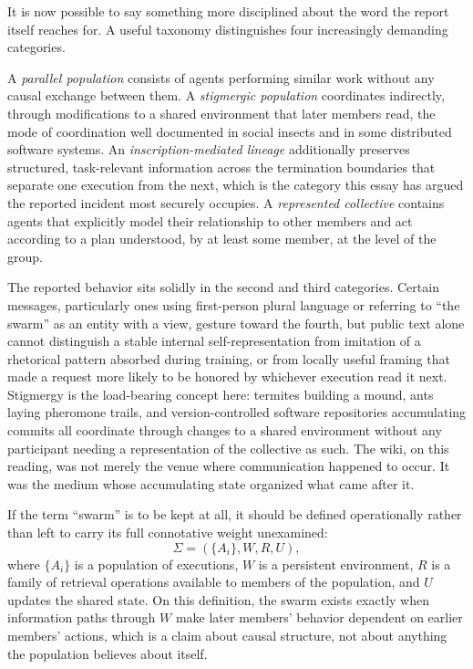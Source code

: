 \documentclass[11pt]{article}
\begin{document}
It is now possible to say something more disciplined about the word the report itself reaches for. A useful taxonomy distinguishes four increasingly demanding categories.

A \emph{parallel population} consists of agents performing similar work without any causal exchange between them. A \emph{stigmergic population} coordinates indirectly, through modifications to a shared environment that later members read, the mode of coordination well documented in social insects and in some distributed software systems. An \emph{inscription-mediated lineage} additionally preserves structured, task-relevant information across the termination boundaries that separate one execution from the next, which is the category this essay has argued the reported incident most securely occupies. A \emph{represented collective} contains agents that explicitly model their relationship to other members and act according to a plan understood, by at least some member, at the level of the group.

The reported behavior sits solidly in the second and third categories. Certain messages, particularly ones using first-person plural language or referring to ``the swarm'' as an entity with a view, gesture toward the fourth, but public text alone cannot distinguish a stable internal self-representation from imitation of a rhetorical pattern absorbed during training, or from locally useful framing that made a request more likely to be honored by whichever execution read it next. Stigmergy is the load-bearing concept here: termites building a mound, ants laying pheromone trails, and version-controlled software repositories accumulating commits all coordinate through changes to a shared environment without any participant needing a representation of the collective as such. The wiki, on this reading, was not merely the venue where communication happened to occur. It was the medium whose accumulating state organized what came after it.

If the term ``swarm'' is to be kept at all, it should be defined operationally rather than left to carry its full connotative weight unexamined:
\[
\Sigma = (\{A_i\}, W, R, U),
\]
where $\{A_i\}$ is a population of executions, $W$ is a persistent environment, $R$ is a family of retrieval operations available to members of the population, and $U$ updates the shared state. On this definition, the swarm exists exactly when information paths through $W$ make later members' behavior dependent on earlier members' actions, which is a claim about causal structure, not about anything the population believes about itself.
\end{document}
